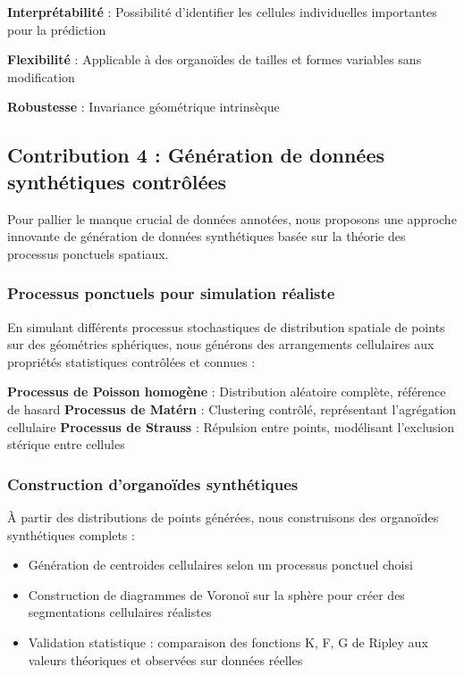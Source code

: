 \textbf{Interprétabilité} : Possibilité d'identifier les cellules individuelles importantes pour la prédiction

\textbf{Flexibilité} : Applicable à des organoïdes de tailles et formes variables sans modification

\textbf{Robustesse} : Invariance géométrique intrinsèque

\subsection{Contribution 4 : Génération de données synthétiques contrôlées}

Pour pallier le manque crucial de données annotées, nous proposons une approche innovante de génération de données synthétiques basée sur la théorie des processus ponctuels spatiaux.

\subsubsection{Processus ponctuels pour simulation réaliste}

En simulant différents processus stochastiques de distribution spatiale de points~\cite{Illian2008,Diggle2013} sur des géométries sphériques, nous générons des arrangements cellulaires aux propriétés statistiques contrôlées et connues :

\textbf{Processus de Poisson homogène} : Distribution aléatoire complète, référence de hasard
\textbf{Processus de Matérn} : Clustering contrôlé, représentant l'agrégation cellulaire
\textbf{Processus de Strauss} : Répulsion entre points, modélisant l'exclusion stérique entre cellules

\subsubsection{Construction d'organoïdes synthétiques}

À partir des distributions de points générées, nous construisons des organoïdes synthétiques complets :
\begin{itemize}
    \item Génération de centroides cellulaires selon un processus ponctuel choisi
    \item Construction de diagrammes de Voronoï sur la sphère pour créer des segmentations cellulaires réalistes
    \item Validation statistique : comparaison des fonctions K, F, G de Ripley aux valeurs théoriques et observées sur données réelles
\end{itemize}

